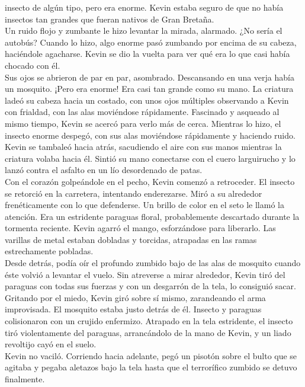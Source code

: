 {insecto de algún tipo, pero era enorme. Kevin estaba seguro de que no
había insectos tan grandes que fueran nativos de Gran Bretaña.\\
Un ruido flojo y zumbante le hizo levantar la mirada, alarmado. ¿No
sería el autobús? Cuando lo hizo, algo enorme pasó zumbando por encima
de su cabeza, haciéndole agacharse. Kevin se dio la vuelta para ver qué
era lo que casi había chocado con él.\\
Sus ojos se abrieron de par en par, asombrado. Descansando en una verja
había un mosquito. ¡Pero era enorme! Era casi tan grande como su mano.
La criatura ladeó su cabeza hacia un costado, con unos ojos múltiples
observando a Kevin con frialdad, con las alas moviéndose rápidamente.
Fascinado y asqueado al mismo tiempo, Kevin se acercó para verlo más de
cerca. Mientras lo hizo, el insecto enorme despegó, con sus alas
moviéndose rápidamente y haciendo ruido.\\
Kevin se tambaleó hacia atrás, sacudiendo el aire con sus manos mientras
la criatura volaba hacia él. Sintió su mano conectarse con el cuero
larguirucho y lo lanzó contra el asfalto en un lío desordenado de
patas.\\
Con el corazón golpeándole en el pecho, Kevin comenzó a retroceder. El
insecto se retorció en la carretera, intentando enderezarse. Miró a su
alrededor frenéticamente con lo que defenderse. Un brillo de color en el
seto le llamó la atención. Era un estridente paraguas floral,
probablemente descartado durante la tormenta reciente. Kevin agarró el
mango, esforzándose para liberarlo. Las varillas de metal estaban
dobladas y torcidas, atrapadas en las ramas estrechamente pobladas.\\
Desde detrás, podía oír el profundo zumbido bajo de las alas de mosquito
cuando éste volvió a levantar el vuelo. Sin atreverse a mirar alrededor,
Kevin tiró del paraguas con todas sus fuerzas y con un desgarrón de la
tela, lo consiguió sacar.\\
Gritando por el miedo, Kevin giró sobre sí mismo, zarandeando el arma
improvisada. El mosquito estaba justo detrás de él. Insecto y paraguas
colisionaron con un crujido enfermizo. Atrapado en la tela estridente,
el insecto tiró violentamente del paraguas, arrancándolo de la mano de
Kevin, y un liado revoltijo cayó en el suelo.\\
Kevin no vaciló. Corriendo hacia adelante, pegó un pisotón sobre el
bulto que se agitaba y pegaba aletazos bajo la tela hasta que el
terrorífico zumbido se detuvo finalmente.\\
}
